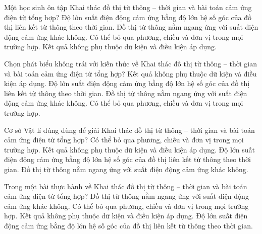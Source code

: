 \begin{ex}
Một học sinh ôn tập Khai thác đồ thị từ thông – thời gian và bài toán cảm ứng điện từ tổng hợp?
\choice
{\True Độ lớn suất điện động cảm ứng bằng độ lớn hệ số góc của đồ thị liên kết từ thông theo thời gian.}
{Đồ thị từ thông nằm ngang ứng với suất điện động cảm ứng khác không.}
{Có thể bỏ qua phương, chiều và đơn vị trong mọi trường hợp.}
{Kết quả không phụ thuộc dữ kiện và điều kiện áp dụng.}
\end{ex}

\begin{ex}
Chọn phát biểu không trái với kiến thức về Khai thác đồ thị từ thông – thời gian và bài toán cảm ứng điện từ tổng hợp?
\choice
{Kết quả không phụ thuộc dữ kiện và điều kiện áp dụng.}
{\True Độ lớn suất điện động cảm ứng bằng độ lớn hệ số góc của đồ thị liên kết từ thông theo thời gian.}
{Đồ thị từ thông nằm ngang ứng với suất điện động cảm ứng khác không.}
{Có thể bỏ qua phương, chiều và đơn vị trong mọi trường hợp.}
\end{ex}

\begin{ex}
Cơ sở Vật lí đúng dùng để giải Khai thác đồ thị từ thông – thời gian và bài toán cảm ứng điện từ tổng hợp?
\choice
{Có thể bỏ qua phương, chiều và đơn vị trong mọi trường hợp.}
{Kết quả không phụ thuộc dữ kiện và điều kiện áp dụng.}
{\True Độ lớn suất điện động cảm ứng bằng độ lớn hệ số góc của đồ thị liên kết từ thông theo thời gian.}
{Đồ thị từ thông nằm ngang ứng với suất điện động cảm ứng khác không.}
\end{ex}

\begin{ex}
Trong một bài thực hành về Khai thác đồ thị từ thông – thời gian và bài toán cảm ứng điện từ tổng hợp?
\choice
{Đồ thị từ thông nằm ngang ứng với suất điện động cảm ứng khác không.}
{Có thể bỏ qua phương, chiều và đơn vị trong mọi trường hợp.}
{Kết quả không phụ thuộc dữ kiện và điều kiện áp dụng.}
{\True Độ lớn suất điện động cảm ứng bằng độ lớn hệ số góc của đồ thị liên kết từ thông theo thời gian.}
\end{ex}

